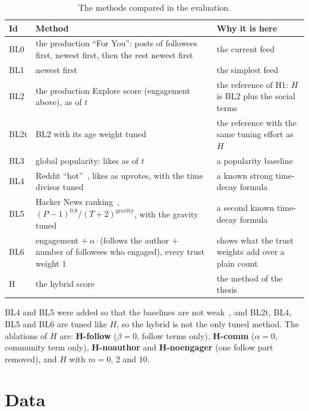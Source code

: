 \begin{table}[htbp]
  \centering
  \caption{The methods compared in the evaluation.}
  \label{tab:method-methods}
  \small
  \renewcommand{\arraystretch}{1.15}
  \begin{tabularx}{\textwidth}{@{}l >{\raggedright\arraybackslash}X >{\raggedright\arraybackslash}X@{}}
    \toprule
    Id & Method & Why it is here \\
    \midrule
    BL0  & the production ``For You'': posts of followees first, newest first, then the rest newest first & the current feed \\
    BL1  & newest first & the simplest feed \\
    BL2  & the production Explore score (engagement above), as of $t$ & the reference of H1: $H$ is BL2 plus the social terms \\
    BL2t & BL2 with its age weight tuned & the reference with the same tuning effort as $H$ \\
    BL3  & global popularity: likes as of $t$ & a popularity baseline \\
    BL4  & Reddit ``hot''~{reddit-hot}, likes as upvotes, with the time divisor tuned & a known strong time-decay formula \\
    BL5  & Hacker News ranking~{shirriff2013}, $(P - 1)^{0.8} / (T + 2)^{\text{gravity}}$, with the gravity tuned & a second known time-decay formula \\
    BL6  & engagement $+\ \alpha \cdot {}$(follows the author $+$ number of followees who engaged), every trust weight 1 & shows what the trust weights add over a plain count \\
    H    & the hybrid score & the method of the thesis \\
    \bottomrule
  \end{tabularx}
\end{table}

BL4 and BL5 were added so that the baselines are not weak~, and BL2t, BL4, BL5 and BL6 are tuned like $H$, so the hybrid is not the only tuned method. The ablations of $H$ are: \textbf{H-follow} ($\beta = 0$, follow terms only), \textbf{H-comm} ($\alpha = 0$, community term only), \textbf{H-noauthor} and \textbf{H-noengager} (one follow part removed), and $H$ with $m = 0$, 2 and 10.

\section{Data}
\label{sec:method-data}


